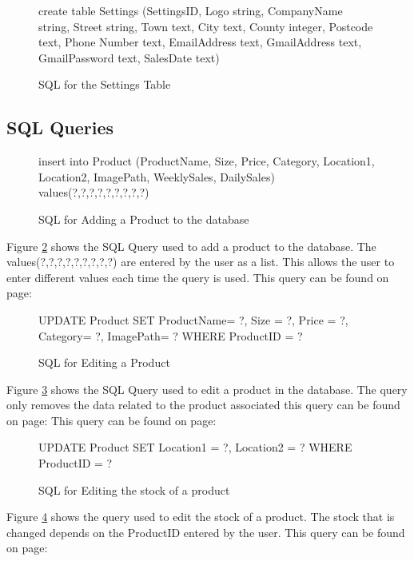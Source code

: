 \begin{figure}[H]
	 \caption{SQL for the Settings Table} \label{fig:settings-sql}
	\begin{sql}
	create table Settings
              (SettingsID,
              Logo string,
              CompanyName string,
              Street string,
              Town text,
              City text,
              County integer,
              Postcode text,
              Phone Number text,
              EmailAddress text,
              GmailAddress text,
              GmailPassword text,
              SalesDate text)
	\end{sql}
\end{figure}

\pagebreak
\subsection{SQL Queries}

\begin{figure}[H]
 \caption{SQL for Adding a Product to the database} \label{fig:add-product-sql}
	\begin{sql}
insert into Product (ProductName, Size, Price, Category, Location1, Location2, ImagePath, WeeklySales, DailySales) values(?,?,?,?,?,?,?,?,?)
	\end{sql}
\end{figure}

Figure \ref{fig:add-product-sql} shows the SQL Query used to add a product to the database. The values(?,?,?,?,?,?,?,?,?) are entered by the user as a list. This allows the user to enter different values each time the query is used. This query can be found on page:

\begin{figure}[H]
	 \caption{SQL for Editing a Product} \label{fig:edit-product-sql}
\begin{sql} 
UPDATE Product SET ProductName= ?,  Size = ?,  Price = ?, Category= ?, ImagePath= ? WHERE ProductID = ?
 \end{sql}
\end{figure}
Figure \ref{fig:edit-product-sql} shows the SQL Query used to edit a product in the database. The query only removes the data related to the product associated this query can be found on page: This query can be found on page: 

\begin{figure}[H]
	 \caption{SQL for Editing the stock of a product} \label{fig:stock-sql}
\begin{sql} 
UPDATE Product SET Location1 = ?, Location2 = ? WHERE ProductID = ? 
\end{sql}
\end{figure}
Figure \ref{fig:stock-sql} shows the query used to edit the stock of a product. The stock that is changed depends on the ProductID entered by the user. This query can be found on page: 

